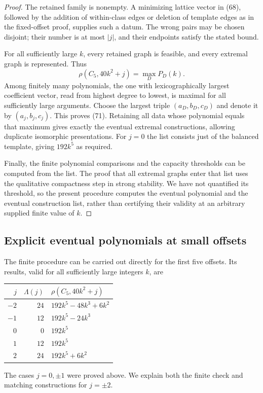 \documentclass[11pt]{amsart}
\theoremstyle{definition}
\theoremstyle{remark}
\begin{document}
\begin{proof}
The retained family is nonempty. A minimizing lattice vector in (68),
followed by the addition of within-class edges or deletion of template
edges as in the fixed-offset proof, supplies such a datum. The wrong
pairs may be chosen disjoint; their number is at most $|j|$, and their
endpoints satisfy the stated bound.

For all sufficiently large $k$, every retained graph is feasible, and
every extremal graph is represented. Thus
\[
 \rho(C_5,40k^2+j)=\max_D P_D(k).
\]
Among finitely many polynomials, the one with lexicographically largest
coefficient vector, read from highest degree to lowest, is maximal for
all sufficiently large arguments. Choose the largest triple
$(a_D,b_D,c_D)$ and denote it by $(a_j,b_j,c_j)$. This proves (71).
Retaining all data whose polynomial equals that maximum gives exactly
the eventual extremal constructions, allowing duplicate isomorphic
presentations. For $j=0$ the list consists just of the balanced
template, giving $192k^5$ as required.

Finally, the finite polynomial comparisons and the capacity thresholds
can be computed from the list. The proof that all extremal graphs
enter that list uses the qualitative compactness step in strong
stability. We have not quantified its threshold, so the present
procedure computes the eventual polynomial and the eventual
construction list, rather than certifying their validity at an
arbitrary supplied finite value of $k$.
\end{proof}

\subsection{Explicit eventual polynomials at small offsets}

The finite procedure can be carried out directly for the first five
offsets. Its results, valid for all sufficiently large integers $k$, are
\begin{center}
\begin{tabular}{rrl}
\toprule
$j$&$\Lambda(j)$&$\rho(C_5,40k^2+j)$\\
\midrule
$-2$&$24$&$192k^5-48k^3+6k^2$\\
$-1$&$12$&$192k^5-24k^3$\\
$0$&$0$&$192k^5$\\
$1$&$12$&$192k^5$\\
$2$&$24$&$192k^5+6k^2$\\
\bottomrule
\end{tabular}
\end{center}
The cases $j=0,\pm1$ were proved above. We explain both the finite
check and matching constructions for $j=\pm2$.
\end{document}
